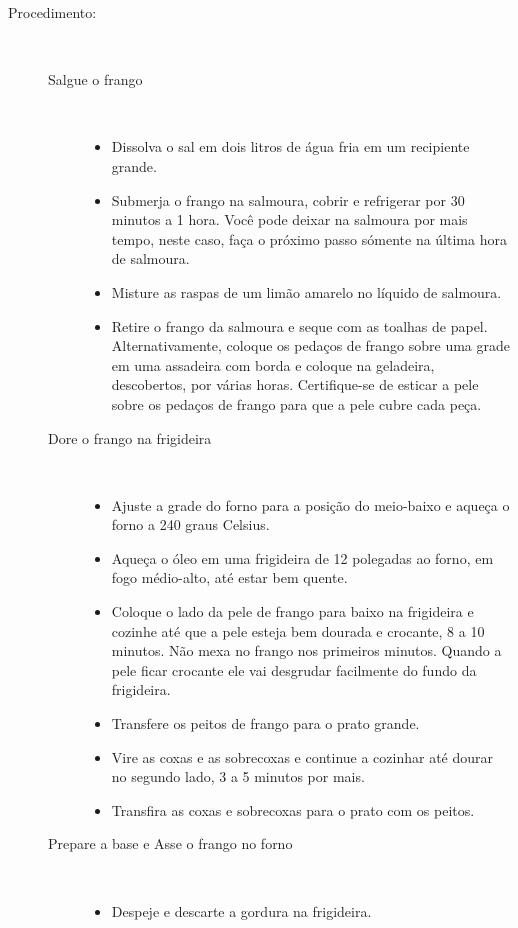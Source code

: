 \documentclass [11pt, letterpaper] {article}
\begin{document}
\begin {description}
\item [Procedimento:] \ \\
\begin {description}
\item [Salgue o frango] \ \\
\begin {itemize}
\item Dissolva o sal em dois litros de água fria em um recipiente grande.
\item Submerja o frango na salmoura, cobrir e refrigerar por 30 minutos a 1 hora. Você pode deixar na salmoura por mais tempo, neste caso, faça o próximo passo s\'omente na última hora de salmoura.
\item Misture as raspas de um limão amarelo no líquido de salmoura.
\item Retire o frango da salmoura e seque com as toalhas de papel. Alternativamente, coloque os pedaços de frango sobre  uma grade em uma assadeira com borda e coloque na geladeira, descobertos, por várias horas. Certifique-se de esticar a pele sobre os pedaços de frango para que a pele cubre cada peça.
\end {itemize}
\item [Dore o frango na frigideira] \ \\
\begin {itemize}
\item Ajuste a grade do forno para a posição do meio-baixo e aqueça o forno a 240 graus Celsius.
\item Aqueça o óleo em uma frigideira de 12 polegadas ao forno, em fogo médio-alto, até estar bem quente.
\item Coloque o lado da pele de frango para baixo na frigideira e cozinhe até que a pele esteja bem dourada e crocante, 8 a 10 minutos. N\~ao mexa no frango nos primeiros minutos. Quando a pele ficar crocante ele vai desgrudar facilmente do fundo da frigideira.
\item Transfere os peitos de frango para o prato grande.
\item Vire as coxas e as sobrecoxas e continue a cozinhar até dourar no segundo lado, 3 a 5 minutos por mais.
\item Transfira as coxas e sobrecoxas para o prato com os peitos.
\end {itemize}
\item [Prepare a base e Asse o frango no forno] \ \\
\begin {itemize}
\item Despeje e descarte a gordura na frigideira.

\end{itemize}
\end{description}
\end{description}
\end{document}

